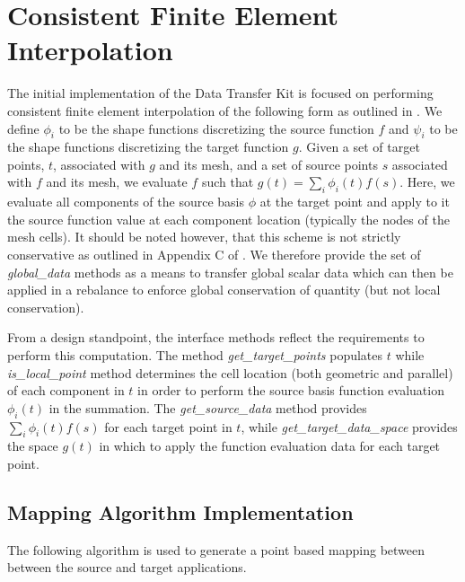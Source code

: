 \documentclass[letterpaper]{article}
\begin{document}
\section{Consistent Finite Element Interpolation}
The initial implementation of the Data Transfer Kit is focused on
performing consistent finite element interpolation of the following
form as outlined in \cite{Farhat_1998} \cite{Jiao_2004}. We define
$\phi_i$ to be the shape functions discretizing the source function
$f$ and $\psi_i$ to be the shape functions discretizing the target
function $g$. Given a set of target points, $t$, associated with $g$
and its mesh, and a set of source points $s$ associated with $f$ and
its mesh, we evaluate $f$ such that $g(t) = \sum_i \phi_i(t)
f(s)$. Here, we evaluate all components of the source basis $\phi$ at
the target point and apply to it the source function value at each
component location (typically the nodes of the mesh cells). It should
be noted however, that this scheme is not strictly conservative as
outlined in Appendix C of \cite{Jiao_2004}. We therefore provide the
set of {\sl global\_data} methods as a means to transfer global scalar
data which can then be applied in a rebalance to enforce global
conservation of quantity (but not local conservation). 

From a design standpoint, the interface methods reflect the
requirements to perform this computation.  The method {\sl
  get\_target\_points} populates $t$ while {\sl is\_local\_point}
method determines the cell location (both geometric and parallel) of
each component in $t$ in order to perform the source basis function
evaluation $\phi_i(t)$ in the summation. The {\sl get\_source\_data}
method provides $\sum_i \phi_i(t)f(s)$ for each target point in $t$,
while {\sl get\_target\_data\_space} provides the space $g(t)$ in
which to apply the function evaluation data for each target point.

\subsection{Mapping Algorithm Implementation}
The following algorithm is used to generate a point based mapping
between between the source and target applications.
\end{document}
